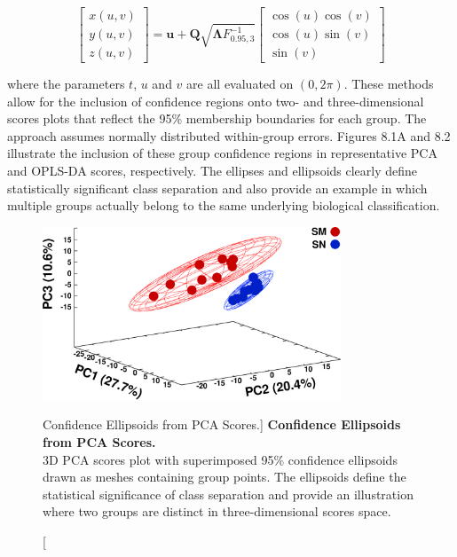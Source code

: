 \begin{equation}
\begin{bmatrix}
x(u,v) \\
y(u,v) \\
z(u,v)
\end{bmatrix}
 = \mathbf{u} + \mathbf{Q} \sqrt{\mathbf{\Lambda} F_{0.95,3}^{-1}}
\begin{bmatrix}
\cos(u) \cos(v) \\
\cos(u) \sin(v) \\
\sin(v)
\end{bmatrix}
\end{equation}

\begin{doublespace}
where the parameters $t$, $u$ and $v$ are all evaluated on $(0,2\pi)$. These
methods allow for the inclusion of confidence regions onto two- and
three-dimensional scores plots that reflect the 95\% membership boundaries
for each group. The approach assumes normally distributed within-group errors.
Figures 8.1A and 8.2 illustrate the inclusion of these group confidence regions
in representative PCA and OPLS-DA scores, respectively. The ellipses and
ellipsoids clearly define statistically significant class separation and also
provide an example in which multiple groups actually belong to the same
underlying biological classification.
\end{doublespace}

\begin{figure}
\includegraphics[width=3.5in]{figs/utils/02.png}
\caption
      [Confidence Ellipsoids from PCA Scores.]{
  {\bf Confidence Ellipsoids from PCA Scores.}
  \\
  3D PCA scores plot with superimposed 95\% confidence ellipsoids drawn as
  meshes containing group points. The ellipsoids define the statistical
  significance of class separation and provide an illustration where two
  groups are distinct in three-dimensional scores space.
}
\end{figure}

